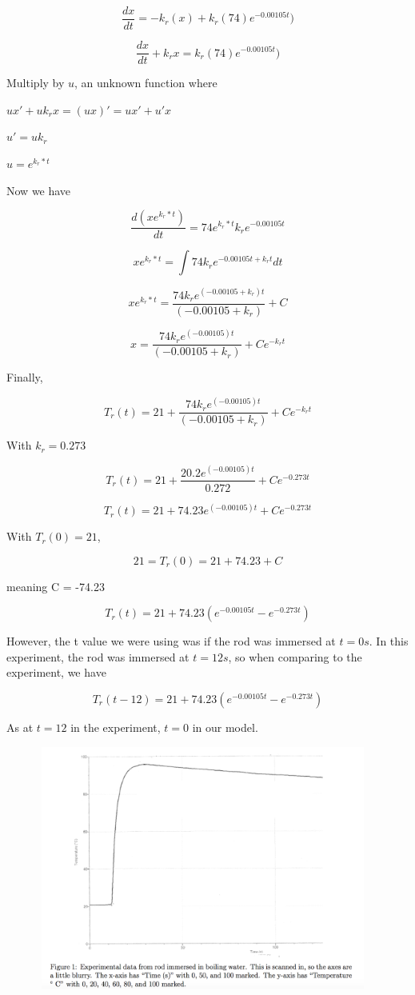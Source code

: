 \documentclass{article}
\begin{document}
$$\frac{dx}{dt} = -k_r(x)+k_r(74)e^{-0.00105t})$$

$$\frac{dx}{dt}+k_rx =k_r(74)e^{-0.00105t})$$

Multiply by $u$, an unknown function where 

$ux' + uk_rx = (ux)' = ux' + u'x$

$u' = uk_r$

$u = e^{k_r*t}$

Now we have

$$\frac{d(xe^{k_r*t})}{dt} = 74e^{k_r*t}k_re^{-0.00105t}$$

$$xe^{k_r*t} = \int74k_re^{-0.00105t+k_rt}dt$$

$$xe^{k_r*t} = \frac{74k_re^{(-0.00105+k_r)t}}{(-0.00105+k_r)}+C$$

$$x = \frac{74k_re^{(-0.00105)t}}{(-0.00105+k_r)}+Ce^{-k_rt}$$

Finally, 

$$T_r(t) = 21 + \frac{74k_re^{(-0.00105)t}}{(-0.00105+k_r)}+Ce^{-k_rt}$$

With $k_r = 0.273$

$$T_r(t) = 21 + \frac{20.2e^{(-0.00105)t}}{0.272}+Ce^{-0.273t}$$

$$T_r(t) = 21 +74.23e^{(-0.00105)t}+Ce^{-0.273t}$$

With $T_r(0) = 21$,

$$21 = T_r(0) = 21 +74.23+C$$

meaning C = -74.23

$$T_r(t) = 21 +74.23(e^{-0.00105t}-e^{-0.273t})$$

However, the t value we were using was if the rod was immersed at $t=0s$. In this experiment, the rod was immersed at $t=12s$, so when comparing to the experiment, we have 

$$T_r(t-12) = 21 +74.23(e^{-0.00105t}-e^{-0.273t})$$

As at $t=12$ in the experiment, $t=0$ in our model. 

\includegraphics[width=13cm, height=8cm]{NewtonCool}
\end{document}

